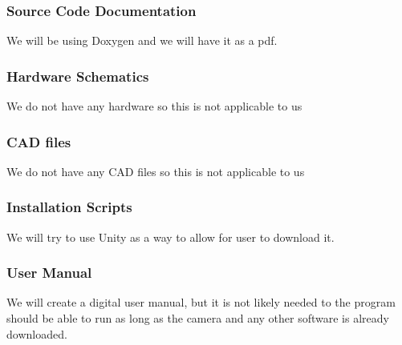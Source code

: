 \subsubsection{Source Code Documentation}

We will be using Doxygen and we will have it as a pdf.

\subsubsection{Hardware Schematics}

We do not have any hardware so this is not applicable to us

\subsubsection{CAD files}

We do not have any CAD files so this is not applicable to us

\subsubsection{Installation Scripts}

We will try to use Unity as a way to allow for user to download it. 

\subsubsection{User Manual}

We will create a digital user manual, but it is not likely needed to the program should be able to run as long as the camera and any other software is already downloaded. 